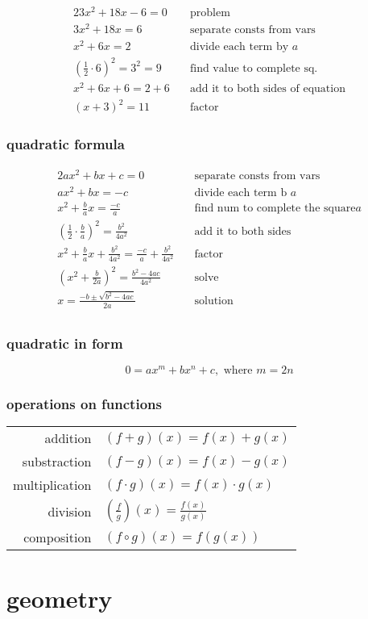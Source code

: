 \documentclass[a4paper,12pt]{article}
\begin{document}
\begin{alignat*}{2}
    3x^{2}+18x-6=0 &\quad \text{problem} \\
    3x^{2}+18x=6 &\quad \text{separate consts from vars} \\
    x^{2}+6x=2 &\quad \text{divide each term by } a \\
    \left(\frac{1}{2} \cdot 6\right)^{2} = 3^{2} = 9 &\quad \text{find value to complete
    sq.} \\
    x^{2}+6x+6=2+6 &\quad \text{add it to both sides of equation} \\
    (x+3)^{2} = 11 &\quad \text{factor}
\end{alignat*}

\subsubsection{quadratic formula}

\begin{alignat*}{2}
    ax^{2}+bx+c=0 &\quad \text{separate consts from vars} \\
    ax^{2}+bx=-c &\quad \text{divide each term b } a \\
    x^{2}+\frac{b}{a}x=\frac{-c}{a} &\quad \text{find num to complete the square} a \\
\left(\frac{1}{2}\cdot\frac{b}{a}\right)^{2} = \frac{b^{2}}{4a^{2}} & \quad
\text{add it to both sides} \\
    x^{2}+\frac{b}{a}x+\frac{b^{2}}{4a^{2}}=\frac{-c}{a}+\frac{b^{2}}{4a^{2} }&\quad \text{factor} \\
    \left(x^{2}+\frac{b}{2a}\right)^{2} = \frac{b^{2}-4ac}{4a^{2}} &\quad \text{solve} \\
    x=\frac{-b\pm\sqrt{b^{2}-4ac}}{2a} &\quad \text{solution} \\
\end{alignat*}

\subsubsection{quadratic in form}

\[ 0 = ax^{m}+bx^{n}+c, \text{ where } m=2n \]

\subsubsection{operations on functions}

\begin{center}
\begin{tabular}{r l}
    addition & \( (f+g)(x)=f(x)+g(x) \) \\
    substraction & \( (f-g)(x)=f(x)-g(x) \) \\
    multiplication & \( (f \cdot g)(x)=f(x)\cdot g(x) \) \\
    division & \( \left( \frac{f}{g} \right)(x) = \frac{f(x)}{g(x)} \) \\
    composition & \(  (f \circ g)(x)=f(g(x)) \)
\end{tabular}
\end{center}

\section{geometry}
\end{document}
